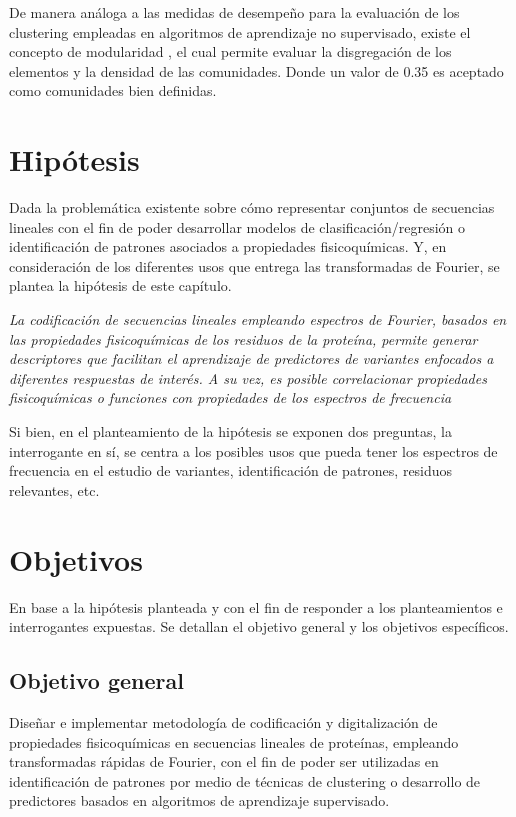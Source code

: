 De manera análoga a las medidas de desempeño para la evaluación de los clustering empleadas en algoritmos de aprendizaje no supervisado, existe el concepto de modularidad \cite{Newman8577}, el cual permite evaluar la disgregación de los elementos y la densidad de las comunidades. Donde un valor de 0.35 es aceptado como comunidades bien definidas.

\section{Hipótesis}

Dada la problemática existente sobre cómo representar conjuntos de secuencias lineales con el fin de poder desarrollar modelos de clasificación/regresión o identificación de patrones asociados a propiedades fisicoquímicas. Y, en consideración de los diferentes usos que entrega las transformadas de Fourier, se plantea la hipótesis de este capítulo.

\begin{center}
	\textit{La codificación de secuencias lineales empleando espectros de Fourier, basados en las
		propiedades fisicoquímicas de los residuos de la proteína, permite generar descriptores
		que facilitan el aprendizaje de predictores de variantes enfocados a diferentes respuestas de
		interés. A su vez, es posible correlacionar propiedades fisicoquímicas o funciones con propiedades de los 
		espectros de frecuencia}
\end{center}

Si bien, en el planteamiento de la hipótesis se exponen dos preguntas, la interrogante en sí, se centra a los posibles usos que pueda tener los espectros de frecuencia en el estudio de variantes, identificación de patrones, residuos relevantes, etc.

\section{Objetivos}

En base a la hipótesis planteada y con el fin de responder a los planteamientos e interrogantes expuestas. Se detallan el objetivo general y los objetivos específicos.

\subsection{Objetivo general}

Diseñar e implementar metodología de codificación y digitalización de propiedades fisicoquímicas en secuencias lineales de proteínas, empleando transformadas rápidas de Fourier, con el fin de poder ser utilizadas en identificación de patrones por medio de técnicas de clustering o desarrollo de predictores basados en algoritmos de aprendizaje supervisado.

